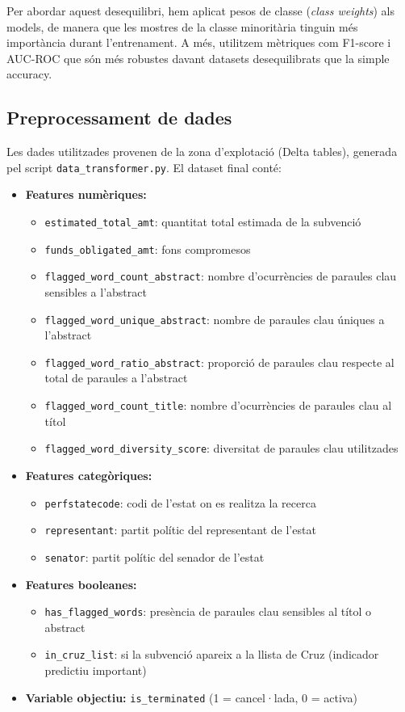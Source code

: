 \documentclass[12pt, a4paper]{article}
\begin{document}
Per abordar aquest desequilibri, hem aplicat pesos de classe (\textit{class weights}) als models, de manera que les mostres de la classe minoritària tinguin més importància durant l'entrenament. A més, utilitzem mètriques com F1-score i AUC-ROC que són més robustes davant datasets desequilibrats que la simple accuracy.

\subsection{Preprocessament de dades}

Les dades utilitzades provenen de la zona d'explotació (Delta tables), generada pel script \texttt{data\_transformer.py}. El dataset final conté:

\begin{itemize}
    \item \textbf{Features numèriques:} 
        \begin{itemize}
            \item \texttt{estimated\_total\_amt}: quantitat total estimada de la subvenció
            \item \texttt{funds\_obligated\_amt}: fons compromesos
            \item \texttt{flagged\_word\_count\_abstract}: nombre d'ocurrències de paraules clau sensibles a l'abstract
            \item \texttt{flagged\_word\_unique\_abstract}: nombre de paraules clau úniques a l'abstract
            \item \texttt{flagged\_word\_ratio\_abstract}: proporció de paraules clau respecte al total de paraules a l'abstract
            \item \texttt{flagged\_word\_count\_title}: nombre d'ocurrències de paraules clau al títol
            \item \texttt{flagged\_word\_diversity\_score}: diversitat de paraules clau utilitzades
        \end{itemize}
    \item \textbf{Features categòriques:} 
        \begin{itemize}
            \item \texttt{perfstatecode}: codi de l'estat on es realitza la recerca
            \item \texttt{representant}: partit polític del representant de l'estat
            \item \texttt{senator}: partit polític del senador de l'estat
        \end{itemize}
    \item \textbf{Features booleanes:}
        \begin{itemize}
            \item \texttt{has\_flagged\_words}: presència de paraules clau sensibles al títol o abstract
            \item \texttt{in\_cruz\_list}: si la subvenció apareix a la llista de Cruz (indicador predictiu important)
        \end{itemize}
    \item \textbf{Variable objectiu:} \texttt{is\_terminated} (1 = cancel·lada, 0 = activa)
\end{itemize}
\end{document}
